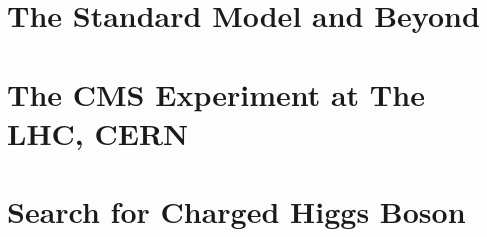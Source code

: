 \documentclass[11pt,english]{scrbook}
\begin{document}

\baselineskip 20pt
\abovedisplayskip=0mm
\belowdisplayskip=5mm
\abovedisplayshortskip=0mm
\belowdisplayskip=5mm
\abovedisplayshortskip=0mm
\belowdisplayshortskip=5mm
\parskip=0.25cm

\pagestyle{plain}

\frontmatter








\tableofcontents
\listoffigures
\listoftables
\markboth{\nomname}{\nomname}
\mainmatter

\pagestyle{fancyplain}
\part{The Standard Model and Beyond}
\label{part:theory} 


\part{The CMS Experiment at The LHC, CERN}
\label{part:cms} 


\part{Search for Charged Higgs Boson}
\label{part:analysis} 


\begin{singlespace}


%
\end{singlespace}


\begin{singlespace}
\printindex{}
\end{singlespace}
\end{document}
